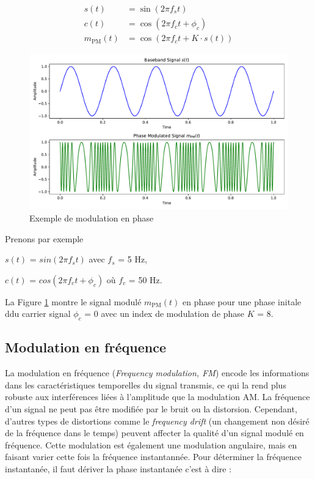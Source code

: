 \begin{align}
    s(t) &= \sin(2\pi f_{s}t) \\
    c(t) &= \cos(2\pi f_{c}t + \phi_{c}) \\
    m_\mathrm{PM}(t) &= \cos\left(2\pi f_{c}t + K \cdot s(t)\right)
\end{align}

\begin{figure}[h]
\centering

\includegraphics[scale=0.5]{images/PM_MOD.pdf}
\caption{Exemple de modulation en phase}\label{term3}
\end{figure}

Prenons par exemple

\vspace{0.1cm}

$s(t)$ = $sin(2\pi f_{s}t)$ avec $f_{s}$ = 5 Hz,

$c(t)$ = $cos(2\pi f_{c}t + \phi_{c})$ où $f_{c}$ = 50 Hz.

\vspace{0.1cm}

La Figure \ref{term3} montre le signal modulé $m_\mathrm{PM}(t)$ en phase pour une phase initale ddu carrier signal $\phi_{c}$ = 0 avec un index de modulation de phase $K$ = 8.




\subsection{Modulation en fréquence}

La modulation en fréquence (\textit{Frequency modulation, FM}) encode les informations dans les caractéristiques temporelles du signal transmis, ce qui la rend plus robuste aux interférences liées à l'amplitude que la modulation AM. La fréquence d'un signal ne peut pas être modifiée par le bruit ou la distorsion. Cependant, d'autres types de distortions comme le \textit{frequency drift} (un changement non désiré de la fréquence dans le temps) peuvent affecter la qualité d'un signal modulé en fréquence. Cette modulation est également une modulation angulaire, mais en faisant varier cette fois la fréquence instantannée. Pour déterminer la fréquence instantanée, il faut dériver la phase instantanée c'est à dire :

